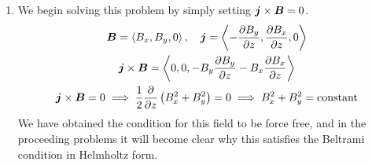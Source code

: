 \documentclass{article}
\begin{document}
\section{}
\begin{enumerate}[label=\alph*.)]
    \item  We begin solving this problem by simply setting $\boldsymbol{j}\times\boldsymbol{B} = 0$. 
    \begin{gather*}
        \boldsymbol{B} = \left< B_x, B_y, 0\right>, \quad \boldsymbol{j} = \left< -\frac{\partial B_y}{\partial z},
        \frac{\partial B_x}{\partial z}, 0\right>\\
        \boldsymbol{j}\times\boldsymbol{B} = \left<0, 0, -B_y\frac{\partial B_y}{\partial z} - B_x\frac{\partial B_x}{\partial z}\right>\\
        \boldsymbol{j}\times\boldsymbol{B} = 0 \implies \frac{1}{2}\frac{\partial }{\partial z}\left(B_x^2 + B_y^2\right) =
        0 \implies B_x^2 + B_y^2 = \text{constant}
    \end{gather*}
    We have obtained the condition for this field to be force free, and in the
    proceeding problems it will become clear why this satisfies the Beltrami
    condition in Helmholtz form. 


\end{enumerate}
\end{document}
